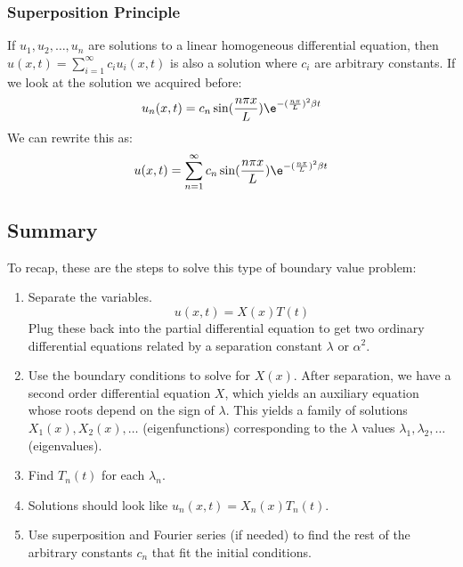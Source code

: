 \documentclass{math}
\begin{document}
\subsubsection*{Superposition Principle}
If \( u_1,u_2,\dots,u_n \) are solutions to a linear homogeneous differential
equation, then \( u(x,t) = \sum_{i=1}^{\infty}c_iu_i(x,t) \) is also a solution
where \( c_i \) are arbitrary constants. If we look at the solution we acquired
before:
\[ u_n(x,t) = c_n\sin(\frac{n\pi x}{L})\e^{-(\frac{n\pi}{L})^2\beta t} \]
We can rewrite this as:
\[ u(x,t) = \sum_{n=1}^{\infty}c_n\sin(\frac{n\pi x}{L})
  \e^{-(\frac{n\pi}{L})^2\beta t} \]

\subsection*{Summary}
To recap, these are the steps to solve this type of boundary value problem:
\begin{enumerate}
  \item Separate the variables.
  \[ u(x,t) = X(x)T(t) \]
  Plug these back into the partial differential equation to get two ordinary
  differential equations related by a separation constant \( \lambda \) or
  \( \alpha^2 \).
  \item Use the boundary conditions to solve for \( X(x) \). After separation,
    we have a second order differential equation \( X \), which yields an
    auxiliary equation whose roots depend on the sign of \( \lambda \). This
    yields a family of solutions \( X_1(x),X_2(x),\dots \) (eigenfunctions)
    corresponding to the \( \lambda \) values \( \lambda_1,\lambda_2,\dots \)
    (eigenvalues).
  \item Find \( T_n(t) \) for each \( \lambda_n \).
  \item Solutions should look like \( u_n(x,t) = X_n(x)T_n(t) \).
  \item Use superposition and Fourier series (if needed) to find the rest of
    the arbitrary constants \( c_n \) that fit the initial conditions.
\end{enumerate}
\end{document}
